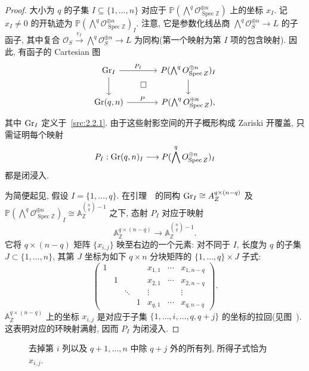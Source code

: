 \begin{proof}
大小为 $q$ 的子集 $I\subseteq\{1,\ldots,n\}$ 对应于 $\mathbb P(\bigwedge^q\mathcal O_{\operatorname{Spec}\mathbb Z}^{\oplus n})$ 上的坐标 $x_I$.
记 $x_I\neq0$ 的开轨迹为 $\mathbb P(\bigwedge^q\mathcal O_{\operatorname{Spec}\mathbb Z}^{\oplus n})_I$.
注意, 它是参数化线丛商 $\bigwedge^q\mathcal O_S^{\oplus n}\to L$ 的子函子, 其中复合 $\mathcal O_S\xrightarrow{e_I}\bigwedge^q\mathcal O_S^{\oplus n}\to L$ 为同构(第一个映射为第 $I$ 项的包含映射).
因此, 有函子的 Cartesian 图
\[
\begin{tikzcd}[column sep=large]
\Gr_I\arrow[r,"P_I"]\arrow[d]\arrow[dr,phantom,"\square"]&
\mathbb P(\bigwedge^q\mathcal O_{\operatorname{Spec}\mathbb Z}^{\oplus n})_I\arrow[d]\\
\Gr(q,n)\arrow[r,"P"]&
\mathbb P(\bigwedge^q\mathcal O_{\operatorname{Spec}\mathbb Z}^{\oplus n}),
\end{tikzcd}
\]
其中 $\operatorname{Gr}_I$ 定义于~\eqref{src:2.2.1}.
由于这些射影空间的开子概形构成 Zariski 开覆盖, 只需证明每个映射
\[
P_I:\operatorname{Gr}(q,n)_I\longrightarrow
P(\bigwedge^qO_{\operatorname{Spec}Z}^{\oplus n})_I
\]
都是闭浸入.

为简便起见, 假设 $I=\{1,\ldots,q\}$.
在引理~~的同构 $\operatorname{Gr}_I\cong A_{Z}^{q\times(n-q)}$ 及
$\mathbb P(\bigwedge^q\mathcal O_{\operatorname{Spec}\mathbb Z}^{\oplus n})_I
\cong\mathbb A_{\mathbb Z}^{\binom nq-1}$
之下, 态射 $P_I$ 对应于映射
\[
\mathbb A_{\mathbb Z}^{q\times(n-q)}
\longrightarrow\mathbb A_{\mathbb Z}^{\binom nq-1}.
\]
它将 $q\times(n-q)$ 矩阵 $\{x_{i,j}\}$ 映至右边的一个元素: 对不同于 $I$, 长度为 $q$ 的子集 $J\subset\{1,\ldots,n\}$, 其第 $J$ 坐标为如下 $q\times n$ 分块矩阵的 $\{1,\ldots,q\}\times J$ 子式: 
\[
\left(\begin{array}{cccc|ccc}
1&&&&x_{1,1}&\cdots&x_{1,n-q}\\
&1&&&x_{2,1}&\cdots&x_{2,n-q}\\
&&\ddots&&\vdots&&\vdots\\
&&&1&x_{q,1}&\cdots&x_{q,n-q}
\end{array}\right).
\]
$\mathbb A_{\mathbb Z}^{q\times(n-q)}$ 上的坐标 $x_{i,j}$ 是对应于子集
$\{1,\ldots,\widehat i,\ldots,q,q+j\}$ 的坐标的拉回(见图~).
这表明对应的环映射满射, 因而 $P_I$ 为闭浸入.
\end{proof}
\begin{figure}[H]
\centering
\caption{去掉第 $i$ 列以及 $q+1,\ldots,n$ 中除 $q+j$ 外的所有列, 所得子式恰为 $x_{i,j}$.}\label{src:2.2.9}
\end{figure}
